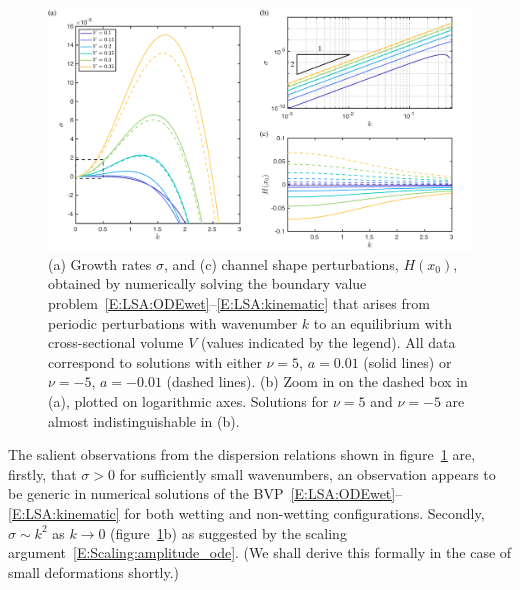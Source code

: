\documentclass{jfm}
\begin{document}
\begin{figure}
\centering
\includegraphics[width =\textwidth]{figures/growth_rates.pdf}
\caption{(a) Growth rates $\sigma$, and (c) channel shape perturbations, $H(x_0)$, obtained by numerically solving the boundary value problem~\eqref{E:LSA:ODEwet}--\eqref{E:LSA:kinematic} that arises from periodic perturbations with wavenumber $k$ to an equilibrium with cross-sectional volume $V$ (values indicated by the legend). All data correspond to solutions with either $\nu = 5$, $a = 0.01$ (solid lines) or $\nu = -5$, $a = -0.01$ (dashed lines). (b) Zoom in on the dashed box in (a), plotted on logarithmic axes. Solutions for $\nu = 5$ and $\nu = -5$ are almost indistinguishable in (b).}
\label{fig:LinearStability:GrowthRates}
\end{figure}


The salient observations from the dispersion relations shown in figure~\ref{fig:LinearStability:GrowthRates} are, firstly, that $\sigma > 0$ for sufficiently small wavenumbers, an observation appears to be generic in numerical solutions of the BVP~\eqref{E:LSA:ODEwet}--\eqref{E:LSA:kinematic} for both wetting and non-wetting configurations. Secondly, $\sigma\sim k^2$ as $k \to 0$ (figure~\ref{fig:LinearStability:GrowthRates}b) as suggested by the scaling argument~\eqref{E:Scaling:amplitude_ode}. (We shall derive this formally in the case of small deformations shortly.)
\end{document}
